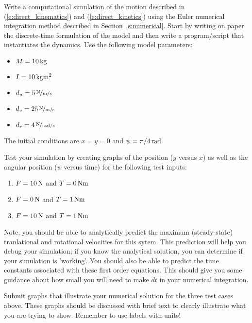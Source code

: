 \begin{ex}\label{ex:direct_sim}
Write a computational simulation of the motion described in (\ref{e:direct_kinematics}) and (\ref{e:direct_kinetics}) using the Euler numerical integration method described in Section~\ref{s:numerical}.  Start by writing on paper the discrete-time formulation of the model and then write a program/script that instantiates the dynamics.  Use the following model parameters:
\begin{itemize}
\item $M=\unit[10]{kg}$
\item $I=\unit[10]{kg m^2}$
\item $d_u=\unitfrac[5]{N}{m/s}$
\item $d_v=\unitfrac[25]{N}{m/s}$
\item $d_r=\unitfrac[4]{N}{rad/s}$
\end{itemize}

\noindent
The initial conditions are $x=y=0$ and $\psi = \unit[\pi/4]{rad}$.  

\noindent
Test your simulation by creating graphs of the position ($y$ versus $x$) as well as the angular position ($\psi$ versus time) for the following test inputs:
\begin{enumerate}
\item $F = \unit[10]{N}$ and $T = \unit[0]{Nm}$
\item $F = \unit[0]{N}$ and $T = \unit[1]{Nm}$
\item $F = \unit[10]{N}$ and $T = \unit[1]{Nm}$
\end{enumerate}


Note, you should be able to analytically predict the maximum (steady-state) tranlational and rotational velocities for this sytem.  This prediction will help you debug your simulation; if you know the analytical solution, you can determine if your simulation is 'working'.  You should also be able to predict the time constants associated with these first order equations.  This should give you some guidance about how small you will need to make $dt$ in your numerical integration.

Submit graphs that illustrate your numerical solution for the three test cases above.  These graphs should be discussed with brief text to clearly illustrate what you are trying to show.  Remember to use labels with units!

\end{ex}


